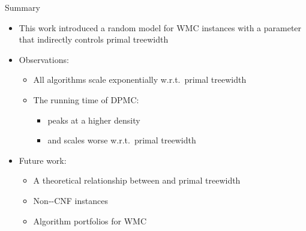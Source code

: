 \documentclass{beamer}
\begin{document}
\begin{frame}{Summary}
  \begin{itemize}
    \item This work introduced a \alert{random model} for WMC instances with a
          parameter that indirectly controls \alert{primal treewidth}
    \item Observations:
    \begin{itemize}
      \item All algorithms \alert{scale exponentially} w.r.t.\ primal treewidth
      \item The running time of \textsc{DPMC}:
      \begin{itemize}
        \item peaks at a higher density
        \item and scales worse w.r.t.\ primal treewidth
      \end{itemize}
    \end{itemize}
    \item Future work:
    \begin{itemize}
      \item A theoretical relationship between \structure{$\rho$} and primal treewidth
      \item Non--CNF instances
      \item Algorithm portfolios for WMC
    \end{itemize}
  \end{itemize}
\end{frame}

\appendix
\end{document}
